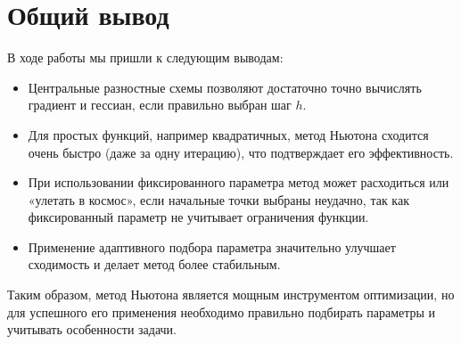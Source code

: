 \documentclass[a4paper,12pt]{article}
\begin{document}
\section{Общий вывод}
В ходе работы мы пришли к следующим выводам:
\begin{itemize}
    \item Центральные разностные схемы позволяют достаточно точно вычислять градиент и гессиан, если правильно выбран шаг \(h\).
    \item Для простых функций, например квадратичных, метод Ньютона сходится очень быстро (даже за одну итерацию), что подтверждает его эффективность.
    \item При использовании фиксированного параметра метод может расходиться или «улетать в космос», если начальные точки выбраны неудачно, так как фиксированный параметр не учитывает ограничения функции.
    \item Применение адаптивного подбора параметра значительно улучшает сходимость и делает метод более стабильным.
\end{itemize}

Таким образом, метод Ньютона является мощным инструментом оптимизации, но для успешного его применения необходимо правильно подбирать параметры и учитывать особенности задачи.
\end{document}
